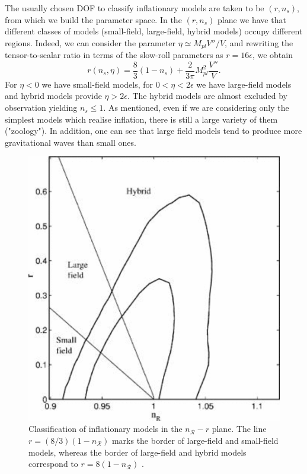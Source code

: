 \documentclass[11pt,a4paper,twoside]{book}
\begin{document}
The usually chosen DOF to classify inflationary models are taken to be $ (r,n_{s}) $, from which we build the parameter space.
In the $ (r,n_{s}) $ plane we have that different classes of models (small-field, large-field, hybrid models) occupy different regions. Indeed, we can consider  the parameter $\eta\simeq M_{pl}V''/V$, and rewriting the tensor-to-scalar ratio in terms of the slow-roll parameters as $r=16\epsilon$, we obtain
\begin{equation}
	r(n_{s},\eta)=\frac{8}{3}(1-n_{s}) + \frac{2}{3\pi}M_{pl}^{2}\frac{V''}{V}.
\end{equation}
For $\eta < 0 $ we have small-field models, for $ 0<\eta<2\epsilon $ we have  large-field models and hybrid models provide $\eta>2\epsilon $. The hybrid models are almost excluded by observation yielding $ n_{s} \le 1 $.
As mentioned, even if we are considering only the simplest models which realise inflation, there is still a large variety of them ("zoology"). In addition, one can see that  large field models tend to produce more gravitational waves than small ones.
\begin{figure}
	\centering
	\includegraphics[width=0.6\linewidth, height=0.3\textheight]{Images/Chap2/r_ns_InflDynamicsAndReheating}
	\caption{Classification of inflationary models in the $ n_{\mathcal{R}}-r $ plane. The line $ r = (8/3)(1-n_{\mathcal{R}}) $ marks the border of large-field and small-field models,  whereas  the border of large-field and hybrid models correspond to $ r=8(1-n_\mathcal{R}) $ \cite{InflationDynamicsAndReheating:chap1}.}
	\label{fig:rnsinfldynamicsandreheating}
\end{figure}
\end{document}
